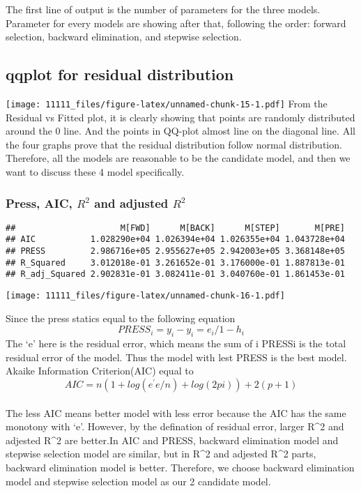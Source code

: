 \documentclass[]{article}
\begin{document}
The first line of output is the number of parameters for the three
models. Parameter for every models are showing after that, following the
order: forward selection, backward elimination, and stepwise selection.

\subsection{qqplot for residual
distribution}\label{qqplot-for-residual-distribution}

\texttt{[image: 11111\_files/figure-latex/unnamed-chunk-15-1.pdf]} From
the Residual vs Fitted plot, it is clearly showing that points are
randomly distributed around the 0 line. And the points in QQ-plot almost
line on the diagonal line. All the four graphs prove that the residual
distribution follow normal distribution. Therefore, all the models are
reasonable to be the candidate model, and then we want to discuss these
4 model specifically.

\subsubsection{\texorpdfstring{Press, AIC, \(R^2\) and adjusted
\(R^2\)}{Press, AIC, R\^{}2 and adjusted R\^{}2}}\label{press-aic-r2-and-adjusted-r2}

\begin{verbatim}
##                     M[FWD]      M[BACK]      M[STEP]       M[PRE]
## AIC           1.028290e+04 1.026394e+04 1.026355e+04 1.043728e+04
## PRESS         2.986716e+05 2.955627e+05 2.942003e+05 3.368148e+05
## R_Squared     3.012018e-01 3.261652e-01 3.176000e-01 1.887813e-01
## R_adj_Squared 2.902831e-01 3.082411e-01 3.040760e-01 1.861453e-01
\end{verbatim}

\texttt{[image: 11111\_files/figure-latex/unnamed-chunk-16-1.pdf]}

Since the press statics equal to the following equation \[
PRESS_{i} = y_{i} - y_{i} = e_{i} / 1 - h_{i} 
\] The `e' here is the residual error, which means the sum of i PRESSi
is the total residual error of the model. Thus the model with lest PRESS
is the best model.\\
Akaike Information Criterion(AIC) equal to \[
AIC = n(1+log(e^{'}e/n) + log(2pi))+2(p+1)
\]\\
The less AIC means better model with less error because the AIC has the
same monotony with `e'. However, by the defination of residual error,
larger R\^{}2 and adjested R\^{}2 are better.In AIC and PRESS, backward
elimination model and stepwise selection model are similar, but in
R\^{}2 and adjested R\^{}2 parts, backward elimination model is better.
Therefore, we choose backward elimination model and stepwise selection
model as our 2 candidate model.
\end{document}
